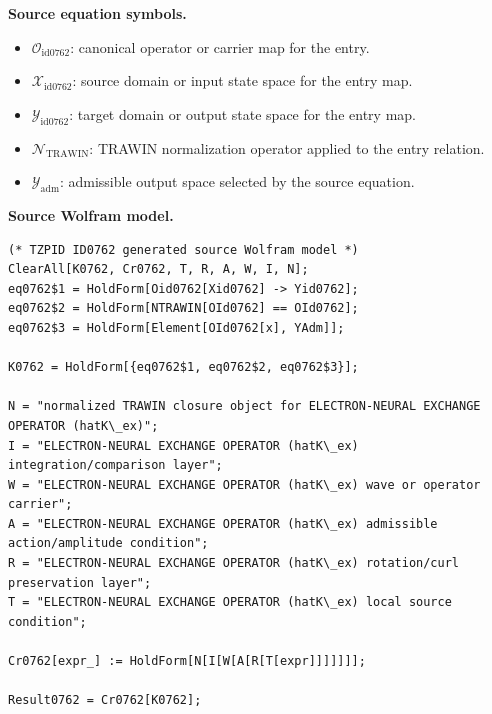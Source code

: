 \begin{minipage}[t]{0.49\linewidth}
\begingroup
\small
\raggedright
\textbf{Source equation symbols.}\par
\begin{itemize}[leftmargin=1.35em,itemsep=1pt,topsep=1pt,parsep=0pt]
    \item $\mathcal{O}_{\mathrm{id0762}}$: canonical operator or carrier map for the entry.
    \item $\mathcal{X}_{\mathrm{id0762}}$: source domain or input state space for the entry map.
    \item $\mathcal{Y}_{\mathrm{id0762}}$: target domain or output state space for the entry map.
    \item $\mathcal{N}_{\mathrm{TRAWIN}}$: TRAWIN normalization operator applied to the entry relation.
    \item $\mathcal{Y}_{\mathrm{adm}}$: admissible output space selected by the source equation.
\end{itemize}
\endgroup
\end{minipage}\hfill
\begin{minipage}[t]{0.47\linewidth}
\begingroup
\scriptsize
\raggedright
\textbf{Source Wolfram model.}\par
\begin{Verbatim}[fontsize=\tiny,breaklines=true,breakanywhere=true]
(* TZPID ID0762 generated source Wolfram model *)
ClearAll[K0762, Cr0762, T, R, A, W, I, N];
eq0762$1 = HoldForm[Oid0762[Xid0762] -> Yid0762];
eq0762$2 = HoldForm[NTRAWIN[OId0762] == OId0762];
eq0762$3 = HoldForm[Element[OId0762[x], YAdm]];

K0762 = HoldForm[{eq0762$1, eq0762$2, eq0762$3}];

N = "normalized TRAWIN closure object for ELECTRON-NEURAL EXCHANGE OPERATOR (hatK\_ex)";
I = "ELECTRON-NEURAL EXCHANGE OPERATOR (hatK\_ex) integration/comparison layer";
W = "ELECTRON-NEURAL EXCHANGE OPERATOR (hatK\_ex) wave or operator carrier";
A = "ELECTRON-NEURAL EXCHANGE OPERATOR (hatK\_ex) admissible action/amplitude condition";
R = "ELECTRON-NEURAL EXCHANGE OPERATOR (hatK\_ex) rotation/curl preservation layer";
T = "ELECTRON-NEURAL EXCHANGE OPERATOR (hatK\_ex) local source condition";

Cr0762[expr_] := HoldForm[N[I[W[A[R[T[expr]]]]]]];

Result0762 = Cr0762[K0762];
\end{Verbatim}
\endgroup
\end{minipage}

